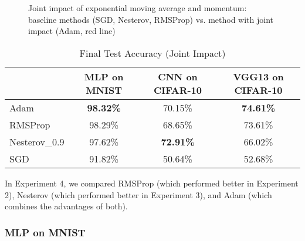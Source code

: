 \documentclass[12pt]{article}
\begin{document}
\begin{figure}[htbp]
    \centering
     \quad
     \\
     \quad
     \\
     \quad
    \caption{Joint impact of exponential moving average and momentum: baseline methods (SGD, Nesterov, RMSProp) vs. method with joint impact (Adam, red line)}
    \label{fig:joint_impact_study}
\end{figure}

\begin{table}[H]
\centering
\caption{Final Test Accuracy (Joint Impact)}
\label{tab:joint_impact}
\begin{tabular}{|l|c|c|c|}
\hline
             & MLP on MNIST & CNN on CIFAR-10 & VGG13 on CIFAR-10 \\ \hline
Adam         & \textbf{98.32\%} & 70.15\%         & \textbf{74.61\%}    \\ \hline
RMSProp      & 98.29\%      & 68.65\%         & 73.61\%           \\ \hline
Nesterov\_0.9 & 97.62\%      & \textbf{72.91\%}  & 66.02\%           \\ \hline
SGD          & 91.82\%      & 50.64\%         & 52.68\%           \\ \hline
\end{tabular}
\end{table}

In Experiment 4, we compared RMSProp (which performed better in Experiment 2), Nesterov (which performed better in Experiment 3), and Adam (which combines the advantages of both).

\subsubsection{MLP on MNIST}
\end{document}
